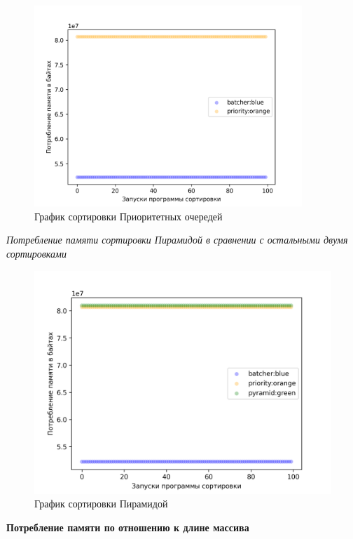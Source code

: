 \begin{figure}[H]
    \centering
    \includegraphics[width=0.9\textwidth]{./plots/priority_memory.png}
    \caption{График сортировки Приоритетных очередей}
\end{figure}



\textit{Потребление памяти сортировки Пирамидой в сравнении с остальными двумя сортировками}

\begin{figure}[H]
    \centering
    \includegraphics[width=1\textwidth]{./plots/bitonic_memory.png}
    \caption{График сортировки Пирамидой}
\end{figure}



\begin{center}
    \textbf{Потребление памяти по отношению к длине массива}
\end{center}




